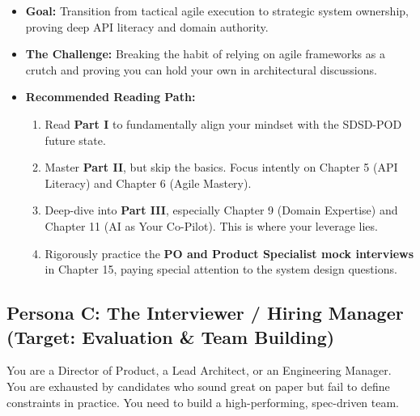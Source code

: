 \documentclass[
  11pt,
  openany,
  oneside]{book}
\providecommand{\tightlist}{%
  \setlength{\itemsep}{0pt}\setlength{\parskip}{0pt}}
\begin{document}
\begin{itemize}
\tightlist
\item
  \textbf{Goal:} Transition from tactical agile execution to strategic
  system ownership, proving deep API literacy and domain authority.
\item
  \textbf{The Challenge:} Breaking the habit of relying on agile
  frameworks as a crutch and proving you can hold your own in
  architectural discussions.
\item
  \textbf{Recommended Reading Path:}

  \begin{enumerate}
  \def\labelenumi{\arabic{enumi}.}
  \tightlist
  \item
    Read \textbf{Part I} to fundamentally align your mindset with the
    SDSD-POD future state.
  \item
    Master \textbf{Part II}, but skip the basics. Focus intently on
    Chapter 5 (API Literacy) and Chapter 6 (Agile Mastery).
  \item
    Deep-dive into \textbf{Part III}, especially Chapter 9 (Domain
    Expertise) and Chapter 11 (AI as Your Co-Pilot). This is where your
    leverage lies.
  \item
    Rigorously practice the \textbf{PO and Product Specialist mock
    interviews} in Chapter 15, paying special attention to the system
    design questions.
  \end{enumerate}
\end{itemize}

\subsection{Persona C: The Interviewer / Hiring Manager (Target:
Evaluation \& Team
Building)}\label{persona-c-the-interviewer-hiring-manager-target-evaluation-team-building}

You are a Director of Product, a Lead Architect, or an Engineering
Manager. You are exhausted by candidates who sound great on paper but
fail to define constraints in practice. You need to build a
high-performing, spec-driven team.
\end{document}

